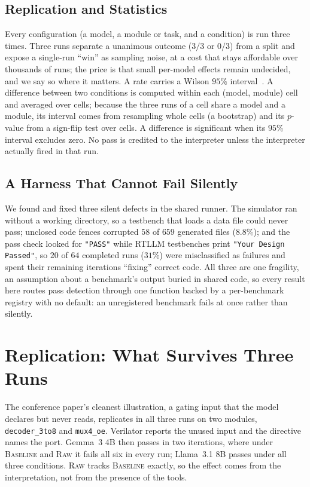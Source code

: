 \documentclass[11pt]{article}
\newcommand{\cname}[1]{\textsc{#1}}
\newcommand{\Base}{\cname{Baseline}}
\newcommand{\Raw}{\cname{Raw}}
\begin{document}
\subsection{Replication and Statistics}
\label{sec:stats}

Every configuration (a model, a module or task, and a condition) is run three
times. Three runs separate a unanimous outcome ($3/3$ or $0/3$) from a split
and expose a single-run ``win'' as sampling noise, at a cost that stays
affordable over thousands of runs; the price is that small per-model effects
remain undecided, and we say so where it matters. A rate carries a Wilson $95\%$
interval~\cite{wilson1927}. A difference between two conditions is computed
within each (model, module) cell and averaged over cells; because the three
runs of a cell share a model and a module, its interval comes from resampling
whole cells (a bootstrap) and its $p$-value from a sign-flip test over cells. A
difference is significant when its $95\%$ interval excludes zero. No pass is
credited to the interpreter unless the interpreter actually fired in that run.

\subsection{A Harness That Cannot Fail Silently}
\label{sec:harness}

We found and fixed three silent defects in the shared runner. The simulator ran
without a working directory, so a testbench that loads a data file could never
pass; unclosed code fences corrupted $58$ of $659$ generated files ($8.8\%$);
and the pass check looked for \texttt{"PASS"} while RTLLM testbenches print
\texttt{"Your Design Passed"}, so $20$ of $64$ completed runs ($31\%$) were
misclassified as failures and spent their remaining iterations ``fixing''
correct code. All three are one fragility, an assumption about a benchmark's
output buried in shared code, so every result here routes pass detection
through one function backed by a per-benchmark registry with no default: an
unregistered benchmark fails at once rather than silently.

\section{Replication: What Survives Three Runs}
\label{sec:replication}

The conference paper's cleanest illustration, a gating input that the model
declares but never reads, replicates in all three runs on two modules,
\texttt{decoder\_3to8} and \texttt{mux4\_oe}. Verilator reports the unused
input and the directive names the port. Gemma~3 4B then passes in two
iterations, where under \Base{} and \Raw{} it fails all six in every run;
Llama~3.1 8B passes under all three conditions. \Raw{} tracks \Base{} exactly,
so the effect comes from the interpretation, not from the presence of the
tools.
\end{document}
